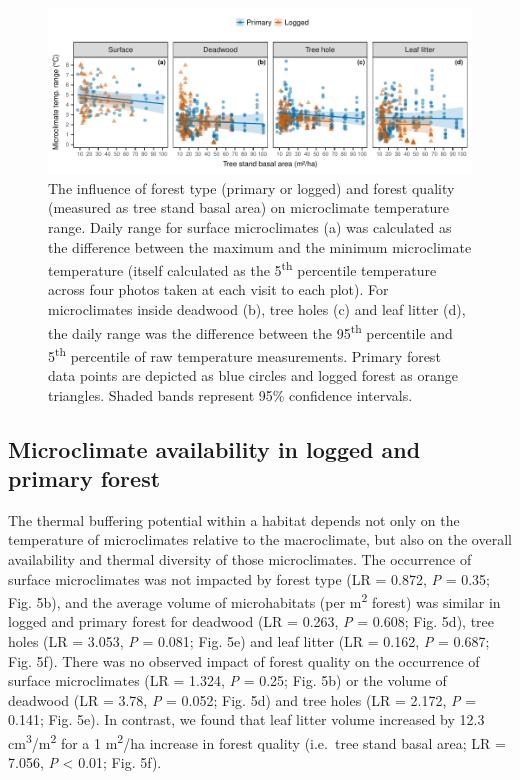 \documentclass[12pt,a4paper,]{report}
\theoremstyle{definition}
\theoremstyle{definition}
\theoremstyle{definition}
\theoremstyle{remark}
\begin{document}
\begin{figure}

{\centering \includegraphics{./output/fig-4-4-1} 

}

\caption{The influence of forest type (primary or logged) and
forest quality (measured as tree stand basal area) on microclimate
temperature range. Daily range for surface microclimates (a) was
calculated as the difference between the maximum and the minimum
microclimate temperature (itself calculated as the 5\textsuperscript{th}
percentile temperature across four photos taken at each visit to each
plot). For microclimates inside deadwood (b), tree holes (c) and leaf
litter (d), the daily range was the difference between the
95\textsuperscript{th} percentile and 5\textsuperscript{th} percentile
of raw temperature measurements. Primary forest data points are depicted
as blue circles and logged forest as orange triangles. Shaded bands
represent 95\% confidence intervals.}\label{fig:fig-4-4}
\end{figure}

\subsection{Microclimate availability in logged and primary
forest}\label{microclimate-availability-in-logged-and-primary-forest}

The thermal buffering potential within a habitat depends not only on the
temperature of microclimates relative to the macroclimate, but also on
the overall availability and thermal diversity of those microclimates.
The occurrence of surface microclimates was not impacted by forest type
(LR = 0.872, \emph{P} = 0.35; Fig. 5b), and the average volume of
microhabitats (per m\textsuperscript{2} forest) was similar in logged
and primary forest for deadwood (LR = 0.263, \emph{P} = 0.608; Fig. 5d),
tree holes (LR = 3.053, \emph{P} = 0.081; Fig. 5e) and leaf litter (LR =
0.162, \emph{P} = 0.687; Fig. 5f). There was no observed impact of
forest quality on the occurrence of surface microclimates (LR = 1.324,
\emph{P} = 0.25; Fig. 5b) or the volume of deadwood (LR = 3.78, \emph{P}
= 0.052; Fig. 5d) and tree holes (LR = 2.172, \emph{P} = 0.141; Fig.
5e). In contrast, we found that leaf litter volume increased by 12.3
cm\textsuperscript{3}/m\textsuperscript{2} for a 1
m\textsuperscript{2}/ha increase in forest quality (i.e.~tree stand
basal area; LR = 7.056, \emph{P} \textless{} 0.01; Fig. 5f).
\end{document}
